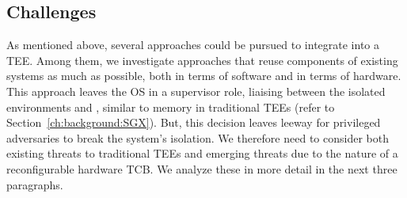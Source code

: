 \subsection{Challenges}
\label{pue:sec:problemStatement:challenges}
As mentioned above, several approaches could be pursued to integrate \sphw into a TEE. Among them, we investigate approaches that reuse components of existing systems as much as possible, both in terms of software and in terms of hardware.  
This approach leaves the OS in a supervisor role, liaising between the isolated environments and \sphw, similar to memory in traditional TEEs (refer to  Section~\ref{ch:background:SGX}). But, this decision leaves leeway for privileged adversaries to break the system's isolation. We therefore need to consider both existing threats to traditional TEEs and emerging threats due to the nature of a reconfigurable hardware TCB. 
We analyze these in more detail in the next three paragraphs.


